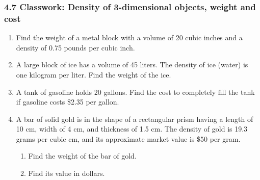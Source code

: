 

\fancyhead[LE]{\thepage}



\subsubsection*{4.7 Classwork: Density of 3-dimensional objects, weight and cost}
\begin{enumerate}

\item Find the weight of a metal block with a volume of 20 cubic inches and a density of 0.75 pounds per cubic inch. \vspace{3cm}
\item A large block of ice has a volume of 45 liters. The density of ice (water) is one kilogram per liter. Find the weight of the ice.  \vspace{3cm}
\item A tank of gasoline holds 20 gallons. Find the cost to completely fill the tank if gasoline costs \$2.35 per gallon. \vspace{3cm}
\item A bar of solid gold is in the shape of a rectangular prism having a length of 10 cm, width of 4 cm, and thickness of 1.5 cm. The density of gold is 19.3 grams per cubic cm, and its approximate market value is \$50 per gram.
\begin{enumerate}
  \item Find the weight of the bar of gold.  \vspace{3cm}
  \item Find its value in dollars.\vspace{2cm}
\end{enumerate}

\newpage

\end{enumerate}
